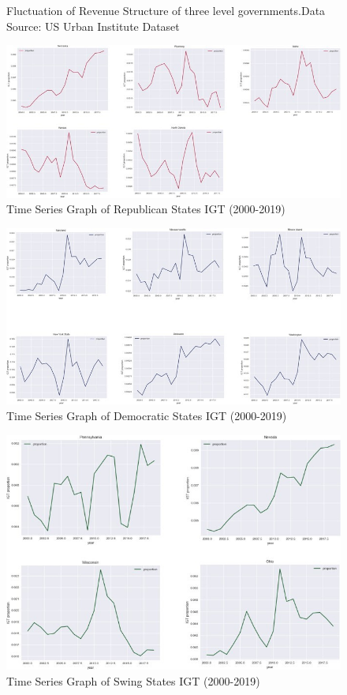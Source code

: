 \begin{figure}[H]
  \caption[Fluctuation of Revenue Structure]{Fluctuation of Revenue Structure of three level governments.Data Source: US Urban Institute Dataset  }    %
  \label{Figure A.1}
\end{figure}


\begin{figure}[H]
  \centering
  \includegraphics[scale=0.7]{Appendix-A/republican.jpg}
  \caption[Time Series Graph of Republican States IGT (2000-2019)]{Time Series Graph of Republican States IGT (2000-2019)
    \texttt{} }
  \label{Figure A.2}
\end{figure}

\begin{figure}[H]
  \centering
  \includegraphics[scale=0.7]{Appendix-A/democratic.jpg}
  \caption[Time Series Graph of Democratic States IGT(2000-2019)]{Time Series Graph of Democratic States IGT (2000-2019)
    \texttt{} }
  \label{Figure A.3}
\end{figure}

\begin{figure}[H]
  \centering
  \includegraphics[scale=0.7]{Appendix-A/swing.jpg}
  \caption[Time Series Graph of Swing States IGT (2000-2019) ]{Time Series Graph of Swing States IGT (2000-2019)
    \texttt{} }
  \label{Figure A.4}
\end{figure}
